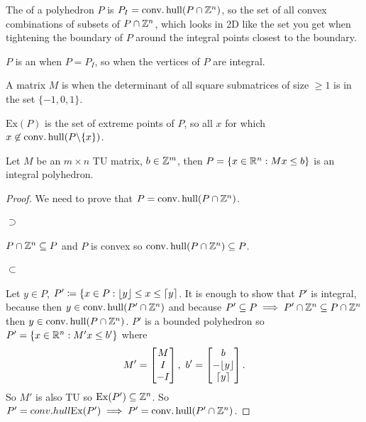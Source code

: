 \documentclass{exam}
\begin{document}
    \begin{define}
        The  of a polyhedron $P$ is $P_I = \operatorname{\mathop{conv.hull}}(P \cap \mathbb{Z}^n)$, so the set of all convex combinations of subsets of $P \cap \mathbb{Z} ^n$, which looks in 2D like the set you get when tightening the boundary of $P$ around the integral points closest to the boundary.

        $P$ is an  when $P=P_I$, so when the vertices of $P$ are integral.

        A matrix $M$ is  when the determinant of all square submatrices of size $\ge 1$ is in the set $\{-1, 0, 1\}$.

        $\mathrm{Ex}(P)$ is the set of extreme points of $P$, so all $x$ for which $x \not \in \operatorname{\mathop{conv.hull}}(P\backslash\{x\})$.
    \end{define}
    \begin{theorem}
        Let $M$ be an $m \times n$ TU matrix, $b \in \mathbb{Z} ^m$, then $P=\{ x \in \mathbb{R}^n : Mx \le b \}$ is an integral polyhedron.
    \end{theorem}
    \begin{proof}
        We need to prove that $P = \operatorname{\mathop{conv.hull}} (P \cap \mathbb{Z} ^n)$.
        \paragraph{$\supset$} $P \cap \mathbb{Z} ^n \subseteq P$ and $P$ is convex so $\operatorname{\mathop{conv.hull}}(P \cap \mathbb{Z} ^n) \subseteq P$.
        \paragraph{$\subset$} Let $y \in P$, $P'\coloneqq \{ x \in P : \lfloor y\rfloor \le x \le \lceil y\rceil$.
        It is enough to show that $P'$ is integral, because then $y \in \operatorname{\mathop{conv.hull}} (P'\cap \mathbb{Z} ^n)$ and because $P' \subseteq P \implies P' \cap \mathbb{Z} ^n \subseteq P \cap \mathbb{Z} ^n $ then $y \in \operatorname{\mathop{conv.hull}}( P \cap \mathbb{Z} ^n)$.
        $P'$ is a bounded polyhedron so $P'=\{ x \in \mathbb{R}^n : M'x \le b' \}$ where
        \[
            M'= \matrix{M \\ I \\ -I},\ b'=\matrix{b \\ -\floor{y} \\ \ceil{y}}.
        \]
        So $M'$ is also TU so $\mathrm{Ex}(P') \subseteq \mathbb{Z} ^n$.
        So $P'= conv.hull \mathrm{Ex}(P') \implies P' = \operatorname{\mathop{conv.hull}}(P'\cap \mathbb{Z} ^n)$.
    \end{proof}
\end{document}
